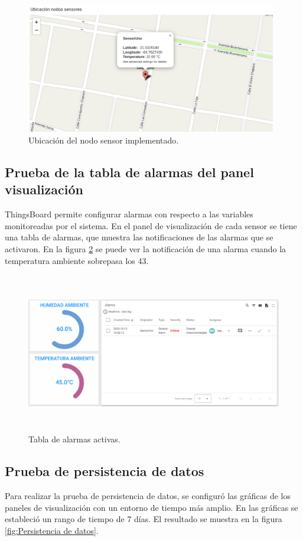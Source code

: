 \begin{figure}[h!]
  \centering
    \includegraphics[width=11cm, height=5.7cm]{./Figures/map2.png}
  \caption{Ubicación del nodo sensor implementado.}
    \label{fig:map thingsboard}
\end{figure}

\subsection{Prueba de la tabla de alarmas del panel visualización}
ThingsBoard permite configurar alarmas con respecto a las variables monitoreadas por el sistema. En el panel de visualización de cada sensor se tiene una tabla de alarmas, que muestra las notificaciones de las alarmas que se activaron.
En la figura \ref{fig:alarmas tb} se puede ver la notificación de una alarma cuando la temperatura ambiente sobrepasa los 43\textcelsius.

\begin{figure}[h!]
  \centering
    \includegraphics[width=\linewidth, height=7cm]{./Figures/alarmas_tb.png}
  \caption{Tabla de alarmas activas.}
    \label{fig:alarmas tb}
\end{figure}

\subsection{Prueba de persistencia de datos}
Para realizar la prueba de persistencia de datos, se configuró las gráficas de los paneles de visualización con un entorno de tiempo más amplio.
En las gráficas se estableció un rango de tiempo de 7 días. El resultado se muestra en la figura \ref{fig:Persistencia de datos}.

